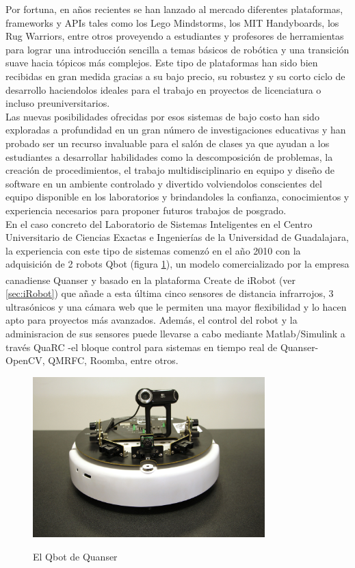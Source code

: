 \documentclass[letterpaper,openright,12pt]{book}
\begin{document}
Por fortuna, en años recientes se han lanzado al mercado diferentes plataformas, frameworks y APIs tales como los Lego Mindstorms, los MIT Handyboards, los Rug Warriors, entre otros \cite{goldweber} proveyendo a estudiantes y profesores de herramientas para lograr una introducción sencilla a temas básicos de robótica y una transición suave hacia tópicos más complejos. Este tipo de plataformas han sido bien recibidas en gran medida gracias a su bajo precio, su robustez y su corto ciclo de desarrollo haciendolos ideales para el trabajo en proyectos de licenciatura o incluso preuniversitarios.\\
Las nuevas posibilidades ofrecidas por esos sistemas de bajo costo han sido exploradas a profundidad en un gran número de investigaciones educativas y han probado ser un recurso invaluable para el salón de clases ya que ayudan a los estudiantes a desarrollar habilidades como la descomposición de problemas, la creación de procedimientos, el trabajo multidisciplinario en equipo\cite{goldweber} y diseño de software en un ambiente controlado y divertido  \cite{salamon} volviendolos conscientes del equipo disponible en los laboratorios y brindandoles la confianza, conocimientos y experiencia necesarios para proponer futuros trabajos de posgrado\cite{challinger}.\\
En el caso concreto del Laboratorio de Sistemas Inteligentes en el Centro Universitario de Ciencias Exactas e Ingenierías de la Universidad de Guadalajara, la experiencia con este tipo de sistemas comenzó en el año 2010 con la adquisición de 2 robots Qbot (figura \ref{fig:qbot}), un modelo comercializado por la empresa canadiense Quanser y basado en la plataforma Create\textsuperscript{\textregistered} de iRobot (ver \ref{sec:iRobot}) que añade a esta última cinco sensores de distancia infrarrojos, 3 ultrasónicos y una cámara web que le permiten una mayor flexibilidad y lo hacen apto para proyectos más avanzados. Además, el control del robot y la adminisracion de sus sensores puede llevarse a cabo mediante Matlab/Simulink a través  QuaRC -el bloque control para sistemas en tiempo real de Quanser- OpenCV, QMRFC, Roomba, entre otros. \cite{huq}\\

\begin{figure}
\begin{center}
\includegraphics[width=0.8\textwidth]{figures/qbot.jpg}
\caption{El Qbot de Quanser}
\centering
\label{fig:qbot}
\end{center}
\end{figure} 
\end{document}
